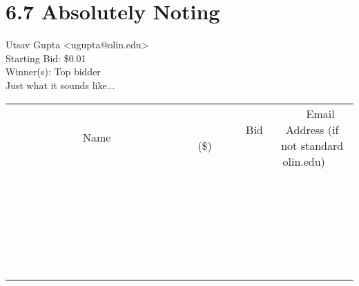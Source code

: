 \documentclass[11pt]{article}
\begin{document}
					\section*{6.7 Absolutely Noting}
					Utsav Gupta <ugupta@olin.edu> \\
					Starting Bid: \$0.01 \\
					Winner(s): Top bidder \\
					Just what it sounds like... \\
					[6ex]
					\begin{tabular}{c c c}
						~~~~~~~~~~~~~Name~~~~~~~~~~~~~ & ~~~~~~~~~Bid (\$)~~~~~~~~~ & ~~~Email Address (if not standard olin.edu)~~~ \\
				
 & & \\
\hline
 & & \\
\hline
 & & \\
\hline
 & & \\
\hline
 & & \\
\hline
 & & \\
\hline
 & & \\
\hline
 & & \\
\hline
 & & \\
\hline
 & & \\
\hline
 & & \\
\hline
 & & \\
\hline
 & & \\
\hline
 & & \\
\hline
 & & \\
\hline
 & & \\
\hline
 & & \\
\hline
 & & \\
\hline
 & & \\
\hline
 & & \\
\hline
 & & \\
\hline
 & & \\
\hline
 & & \\
\hline
 & & \\
\hline
 & & \\
\hline
 & & \\
\hline
					\end{tabular}
					\clearpage
				
\end{document}
